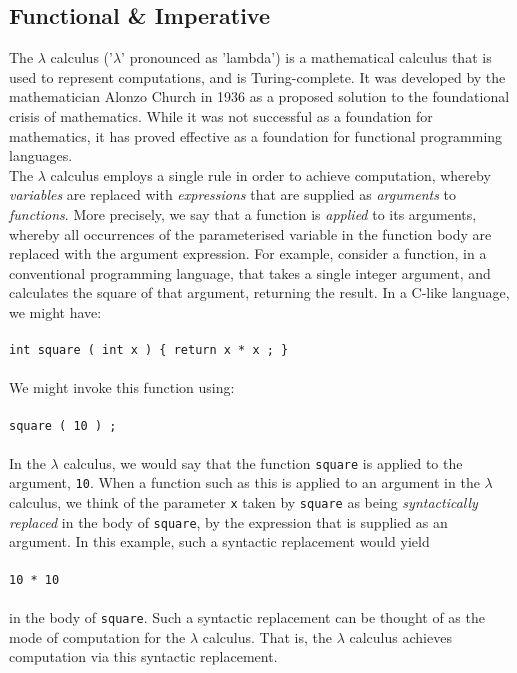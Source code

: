 \documentclass{article}
\begin{document}
\subsection{Functional \& Imperative}
The $\lambda$ calculus ('$\lambda$' pronounced as 'lambda') is a mathematical calculus that is used to represent computations, and is Turing-complete. It was developed by the mathematician Alonzo Church in 1936 as a proposed solution to the foundational crisis of mathematics. While it was not successful as a foundation for mathematics, it has proved effective as a foundation for functional programming languages.
\\
\indent The $\lambda$ calculus employs a single rule in order to achieve computation, whereby \emph{variables} are replaced with \emph{expressions} that are supplied as \emph{arguments} to \emph{functions}. More precisely, we say that a function is \emph{applied} to its arguments, whereby all occurrences of the parameterised variable in the function body are replaced with the argument expression. For example, consider a function, in a conventional programming language, that takes a single integer argument, and calculates the square of that argument, returning the result. In a C-like language, we might have:
\\\\
\indent \texttt{int square ( int x ) \{ return x * x ; \}}
\\\\
We might invoke this function using:
\\\\
\indent \texttt{square ( 10 ) ;}
\\\\
In the $\lambda$ calculus, we would say that the function \texttt{square} is applied to the argument, \texttt{10}. When a function such as this is applied to an argument in the $\lambda$ calculus, we think of the parameter \texttt{x} taken by \texttt{square} as being \emph{syntactically replaced} in the body of \texttt{square}, by the expression that is supplied as an argument. In this example, such a syntactic replacement would yield
\\\\
\indent \texttt{10 * 10}
\\\\
in the body of \texttt{square}. Such a syntactic replacement can be thought of as the mode of computation for the $\lambda$ calculus. That is, the $\lambda$ calculus achieves computation via this syntactic replacement.
\\
\end{document}
